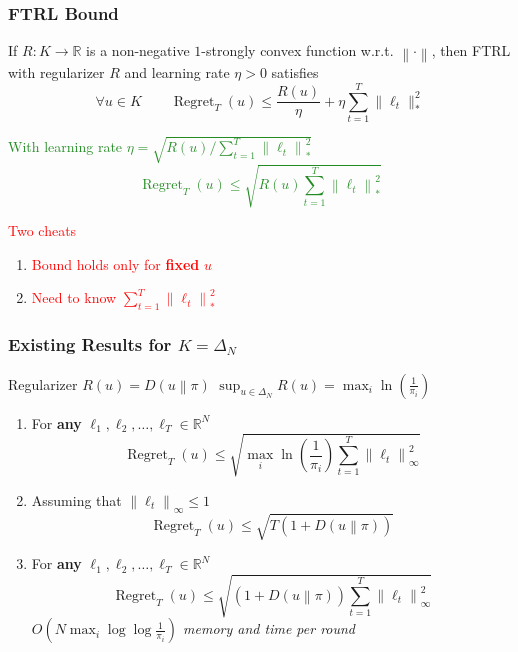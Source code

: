 \documentclass[usenames,dvipsnames]{beamer}
\DeclareMathOperator{\Regret}{Regret}
\newcommand{\R}{\mathbb{R}}
\newcommand{\norm}[1]{\left\|#1\right\|}
\newcommand{\KL}[2]{D\left({#1}\middle\|{#2}\right)}
\newcommand{\Cite}[1]{{\tiny \textcolor{Blue}{[#1]}}}
\begin{document}
\begin{frame}
\frametitle{FTRL Bound}

\begin{theorem}[\textcolor{Blue}{CBL'06, SS'11}]
If $R:K \to \R$ is a non-negative $1$-strongly convex function w.r.t. $\norm{\cdot}$, then FTRL
with regularizer $R$ and learning rate $\eta > 0$ satisfies
$$
\forall u \in K \qquad  \Regret_T(u) \le \frac{R(u)}{\eta} + \eta \sum_{t=1}^T \|\ell_t\|_*^2
$$
\end{theorem}

\textcolor{ForestGreen}{
With learning rate $\eta = \sqrt{R(u)/\sum_{t=1}^T \norm{\ell_t}_*^2}$
$$
\Regret_T(u) \le \sqrt{R(u) \sum_{t=1}^T \norm{\ell_t}_*^2}
$$}

\textcolor{red}{Two cheats}
\begin{enumerate}
\item \textcolor{red}{Bound holds only for \textbf{fixed} $u$}
\item \textcolor{red}{Need to know $\sum_{t=1}^T \norm{\ell_t}_*^2$}
\end{enumerate}

\end{frame}

\begin{frame}
\frametitle{Existing Results for $K=\Delta_N$}

Regularizer $R(u) = \KL{u}{\pi}$ \qquad $\sup_{u \in \Delta_N} R(u) = \max_{i} \ln\left(\frac{1}{\pi_i} \right)$

\vspace{0.5cm}

\begin{enumerate}

\item For \textbf{any} $\ell_1, \ell_2, \dots, \ell_T \in \R^N$ \qquad \Cite{deREGK'11, OP'15}
$$
\Regret_T(u) \le \sqrt{\max_i \ln \left( \frac{1}{\pi_i} \right) \sum_{t=1}^T \norm{\ell_t}_\infty^2}
$$

\item Assuming that $\norm{\ell_t}_\infty \le 1$ \qquad \Cite{CFH'09, CV'10, LS'14, LS'15, KE'15, FRS'15, OP'16}
$$
\Regret_T(u) \le \sqrt{T \left(1 + \KL{u}{\pi}\right)}
$$

\item For \textbf{any} $\ell_1, \ell_2, \dots, \ell_T \in \R^N$ \qquad  \Cite{FRS'15+OP'15}
$$
\Regret_T(u) \le \sqrt{(1 + \KL{u}{\pi}) \sum_{t=1}^T \norm{\ell_t}_\infty^2}
$$
\emph{$O(N \max_{i} \log \log \frac{1}{\pi_i})$ memory and time per round}
\end{enumerate}
\end{frame}
\end{document}
